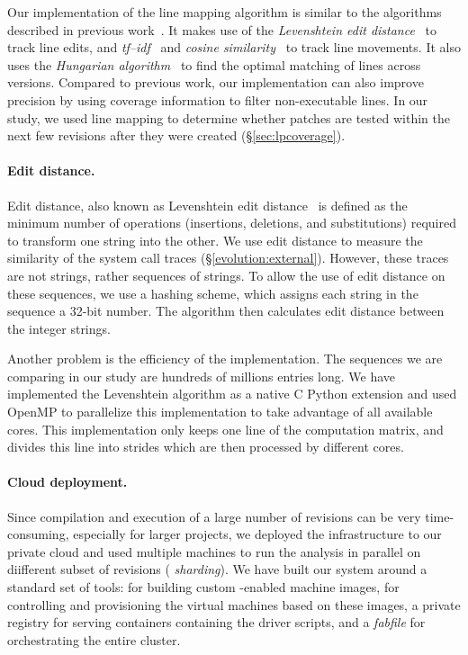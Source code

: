 Our implementation of the line mapping algorithm is similar to the
algorithms described in previous
work~\cite{szz:msr05,szz:ase06,change-source-code:msr07,szzrevisited:defects08}.
It makes use of the \emph{Levenshtein edit
  distance}~\cite{levenshtein1966binary} to track line edits, and
\emph{tf--idf}~\cite{tf-idf} and \emph{cosine
  similarity}~\cite{cosinesimilarity} to track line movements.  It
also uses the \emph{Hungarian algorithm}~\cite{hungarian} to find the
optimal matching of lines across versions.  Compared to previous work,
our implementation can also improve precision by using coverage information to filter
non-executable lines.
In our study, we used line mapping to determine whether patches are
tested within the next few revisions after they were created
(\S\ref{sec:lpcoverage}).

\paragraph{Edit distance.} Edit distance, also known as Levenshtein edit
distance~\cite{levenshtein1966binary} is defined as the minimum number of
operations (insertions, deletions, and substitutions) required to transform one
string into the other. We use edit distance to measure the similarity of the
system call traces (\S\ref{evolution:external}). However, these traces are
not strings, rather sequences of strings. To allow the use of edit distance on
these sequences, we use a hashing scheme, which assigns each string in the
sequence a 32-bit number. The algorithm then calculates edit distance between
the integer strings.

Another problem is the efficiency of the implementation. The sequences we are
comparing in our study are hundreds of millions entries long. We have
implemented the Levenshtein algorithm as a native C Python extension and used
OpenMP to parallelize this implementation to take advantage of all available
cores. This implementation only keeps one line of the computation matrix, and
divides this line into strides which are then processed by different cores.

\paragraph{Cloud deployment.} Since compilation and execution of a large number
of revisions can be very time-consuming, especially for larger projects, we
deployed the infrastructure to our private cloud and used multiple machines to
run the analysis in parallel on diifferent subset of revisions (\ie
\emph{sharding}). We have built our system around a standard set of tools:
\packer for building custom \docker-enabled machine images, \vagrant for
controlling and provisioning the virtual machines based on these images, a
private \docker registry for serving \docker containers containing the driver
scripts, and a \emph{fabfile} for orchestrating the entire cluster.

